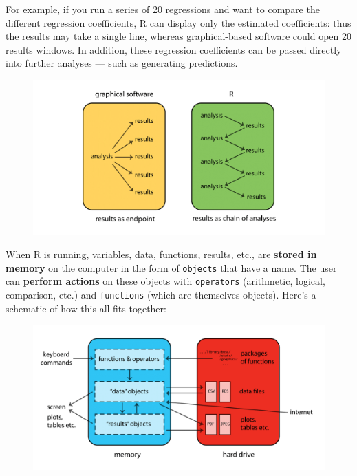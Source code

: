\documentclass[]{book}
\begin{document}
For example, if you run a series of 20 regressions and want to compare
the different regression coefficients, R can display only the estimated
coefficients: thus the results may take a single line, whereas
graphical-based software could open 20 results windows. In addition,
these regression coefficients can be passed directly into further
analyses --- such as generating predictions.

\begin{figure}
\centering
\includegraphics{R/Rintro/images/R_chain.png}
\caption{}
\end{figure}

When R is running, variables, data, functions, results, etc., are
\textbf{stored in memory} on the computer in the form of
\texttt{objects} that have a name. The user can \textbf{perform actions}
on these objects with \texttt{operators} (arithmetic, logical,
comparison, etc.) and \texttt{functions} (which are themselves objects).
Here's a schematic of how this all fits together:

\begin{figure}
\centering
\includegraphics{R/Rintro/images/R_works.png}
\caption{}
\end{figure}
\end{document}
